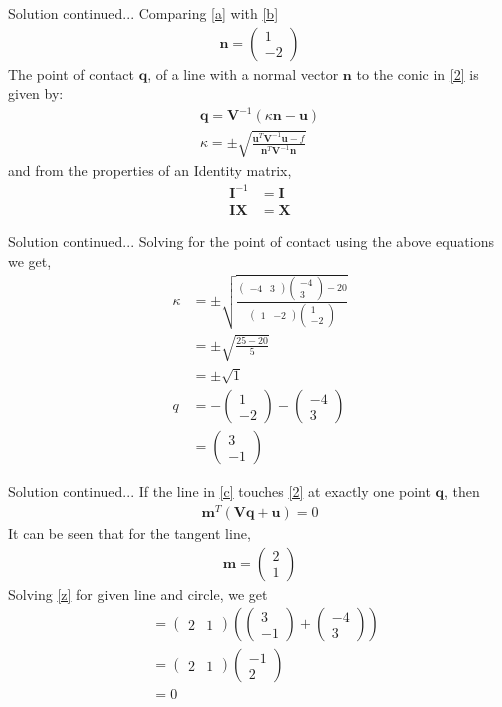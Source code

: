 \documentclass{beamer}
\renewcommand{\vec}[1]{\mathbf{#1}}
\providecommand{\brak}[1]{\ensuremath{\left(#1\right)}}
\theoremstyle{remark}
\newcommand{\myvec}[1]{\ensuremath{\begin{pmatrix}#1\end{pmatrix}}}
\numberwithin{equation}{subsection}
\let\vec\mathbf
\begin{document}
\begin{frame}{Solution continued...}
Comparing \eqref{a} with \eqref{b}
\begin{align}
\vec{n} = \myvec{1 \\ -2}
\end{align}
 The point of contact $\vec{q}$, of a line with a normal vector $\vec{n}$ to the conic in \eqref{2} is given by:
\begin{align}
\vec{q} = \vec{V}^{-1}\brak{\kappa \vec{n}-\vec{u}} \\
\kappa = \pm \sqrt{\frac{\vec{u}^T\vec{V}^{-1}\vec{u}-f}{\vec{n}^T\vec{V}^{-1}\vec{n}}} 
\end{align}
and from the properties of an Identity matrix, 
\begin{align}
\vec{I}^{-1} &= \vec{I} \\
\vec{I}\vec{X} &= \vec{X}   
\end{align}
\end{frame}

\begin{frame}{Solution continued...}
    Solving for the point of contact using the above equations we get,
\begin{align}
\kappa &= \pm \sqrt{\frac{\myvec{ -4 & 3 }\myvec{-4 \\ 3} - 20}{\myvec{1 & -2 }\myvec{1 \\ -2 }}} \\
&= \pm \sqrt{\frac{25 - 20}{5}} \\
& =  \pm \sqrt{1} \\
q &= -\myvec{ 1\\-2 } - \myvec{-4 \\ 3} \\
&= \myvec{3 \\ -1}
\end{align}

\end{frame}
\begin{frame}{Solution continued...}
If the line in \eqref{c} touches \eqref{2} at exactly one point $\vec{q}$, then 
\begin{align}
\vec{m}^T\brak{\vec{V}\vec{q}+\vec{u}} = 0 \label{z}
\end{align}
It can be seen that for the tangent line,
\begin{align}
\vec{m} = \myvec{2 \\ 1} 
\end{align}
Solving \eqref{z} for given line and circle, we get
\begin{align}
&= \myvec{2 & 1}\brak{\myvec{3 \\ -1}+\myvec{-4 \\ 3}} \\
&= \myvec{2 & 1}\myvec{-1 \\ 2}\\
&= 0
\end{align}

\end{frame}
\end{document}
